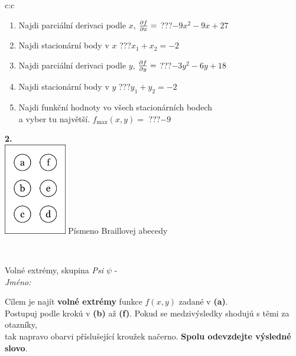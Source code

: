 \documentclass[10pt]{report}
\begin{document}
\begin{tabular}{c:c}
\begin{minipage}[c][104.5mm][t]{0.5\linewidth}
\begin{center}
\begin{minipage}{0.79\linewidth}
\begin{center}
\begin{varwidth}{\linewidth}
\begin{enumerate}
\item Najdi parciální derivaci podle $x$, $\pdv{f}{x}=$\quad \dotfill\; ???\;\dotfill \quad $-9x^2-9x+27$
\item Najdi stacionární body v $x$\quad \dotfill\; ???\;\dotfill \quad $x_1+x_2=-2$
\item Najdi parciální derivaci podle $y$, $\pdv{f}{y}=$\quad \dotfill\; ???\;\dotfill \quad $-3y^2-6y+18$
\item Najdi stacionární body v $y$\quad \dotfill\; ???\;\dotfill \quad $y_1+y_2=-2$
\item Najdi funkční hodnoty vo všech stacionárních bodech \\ \phantom{xxxxxx} a vyber tu najvětší. $f_{\text{max}}(x,y)=$\quad \dotfill\; ???\;\dotfill \quad $-9$
\end{enumerate}
\end{varwidth}
\end{center}
\end{minipage}
\begin{minipage}{0.20\linewidth}
\begin{center}
{\Huge\bfseries 2.} \\[2mm]
\includegraphics[height=40mm]{../images/braille.png}
{\small Písmeno Braillovej abecedy}
\end{center}
\end{minipage}
\end{center}
\end{minipage}
\\ \hdashline
\begin{minipage}[c][104.5mm][t]{0.5\linewidth}
\begin{center}
\vspace{7mm}
{\huge Volné extrémy, skupina \textit{Psi $\psi$} -}\\[5mm]
\textit{Jméno:}\phantom{xxxxxxxxxxxxxxxxxxxxxxxxxxxxxxxxxxxxxxxxxxxxxxxxxxxxxxxxxxxxxxxxx}\\[5mm]
\begin{minipage}{0.95\linewidth}
\begin{center}
Cílem je najít \textbf{volné extrémy} funkce $f(x,y)$ zadané v \textbf{(a)}.\\Postupuj podle krokú v \textbf{(b)} až \textbf{(f)}. Pokud se medzivýsledky shodujú s těmi za otazníky,\\tak napravo obarvi příslušející kroužek načerno. \textbf{Spolu odevzdejte výsledné slovo}.

\end{center}
\end{minipage}
\end{center}
\end{minipage}
\end{tabular}
\end{document}
